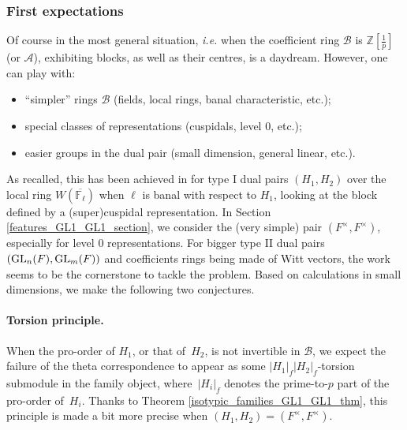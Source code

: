 \documentclass[11pt]{article}
\theoremstyle{plain}
\theoremstyle{definition}
\theoremstyle{plain}
\theoremstyle{definition}
\theoremstyle{plain}
\begin{document}
\subsubsection*{First expectations}

Of course in the most general situation, \textit{i.e.} when the coefficient ring $\mathcal{B}$ is $\mathbb{Z}[\frac{1}{p}]$ (or $\mathcal{A}$), exhibiting blocks, as well as their centres, is a daydream. However, one can play with:
\begin{itemize}
\item ``simpler'' rings $\mathcal{B}$ (fields, local rings, banal characteristic, etc.);
\item special classes of representations (cuspidals, level 0, etc.);
\item easier groups in the dual pair (small dimension, general linear, etc.).
\end{itemize}
As recalled, this has been achieved in \cite[Sec. 5.3]{trias_theta1} for type I dual pairs $(H_1,H_2)$ over the local ring $W(\overline{\mathbb{F}_\ell})$ when $\ell$ is banal with respect to $H_1$, looking at the block defined by a (super)cuspidal representation. In Section \ref{features_GL1_GL1_section}, we consider the (very simple) pair $(F^\times,F^\times)$, especially for level $0$ representations. For bigger type II dual pairs $(\textup{GL}_n(F),\textup{GL}_m(F))$ and coefficients rings being made of Witt vectors, the work \cite{helm_bernstein_center} seems to be the cornerstone to tackle the problem. Based on calculations in small dimensions, we make the following two conjectures.

\paragraph{Torsion principle.} When the pro-order of $H_1$, or that of~$H_2$, is
not invertible in $\mathcal{B}$, we expect the failure of the theta correspondence to appear as some $|H_1|_f |H_2|_f$-torsion submodule in the family object, where~$|H_i|_f$ denotes the prime-to-$p$ part of the pro-order of~$H_i$. Thanks to Theorem \ref{isotypic_families_GL1_GL1_thm}, this principle is made a bit more precise when $(H_1,H_2)=(F^\times,F^\times)$.
\end{document}
